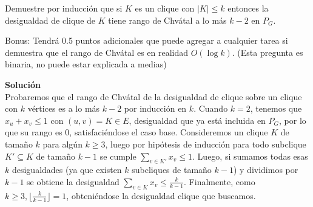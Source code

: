 \documentclass{article}
\theoremstyle{plain}
\theoremstyle{definition}
\theoremstyle{Azul}
\begin{document}
\begin{enumerate}[(a)]
Demuestre por inducción que si $K$ es un clique con $|K|\leq k$ entonces la desigualdad de clique de $K$ tiene rango de Chvátal a lo más $k-2$ en $P_G$.

Bonus: Tendrá 0.5 puntos adicionales que puede agregar a cualquier tarea si demuestra que el rango de Chvátal es en realidad $O(\log k)$. (Esta pregunta es binaria, no puede estar explicada a medias)

\textbf{Solución}\\
Probaremos que el rango de Chvátal de la desigualdad de clique sobre un clique con $k$ vértices es a lo más $k-2$ por inducción en $k$. Cuando $k=2$, tenemos que $x_{u}+x_{v}\leq 1$ con $(u,v)=K \in E$, desigualdad que ya está incluida en $P_{G}$, por lo que su rango es 0, satisfaciéndose el caso base. Consideremos un clique $K$ de tamaño $k$ para algún $k\geq 3$, luego por hipótesis de inducción para todo subclique $K'\subseteq K$ de tamaño $k-1$ se cumple $\sum_{v\in K'}x_{v}\leq 1$. Luego, si sumamos todas esas $k$ desigualdades (ya que existen $k$ subcliques de tamaño $k-1$) y dividimos por $k-1$ se obtiene la desigualdad $\sum_{v\in K}x_{v}\leq \frac{k}{k-1}$. Finalmente, como $k\geq 3, \lfloor\frac{k}{k-1}\rfloor=1$, obteniéndose la desigualdad clique que buscamos.

\end{enumerate}
\end{document}

